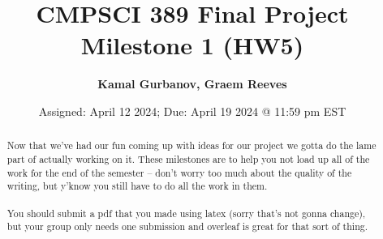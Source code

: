 \documentclass{article}
\begin{document}
\title{CMPSCI 389 Final Project Milestone 1 (HW5)}
\author{\textbf{Kamal Gurbanov, Graem Reeves}}
\date{Assigned: April 12 2024; Due: April 19 2024 @ 11:59 pm EST}

\maketitle

\begin{abstract}
    Now that we've had our fun coming up with ideas for our project we gotta do the lame part of actually working on it. These milestones are to help you not load up all of the work for the end of the semester -- don't worry too much about the quality of the writing, but y'know you still have to do all the work in them. \\ \\
    You should submit a pdf that you made using latex (sorry that's not gonna change), but your group only needs one submission and overleaf is great for that sort of thing. 
    
\end{abstract}
\end{document}
